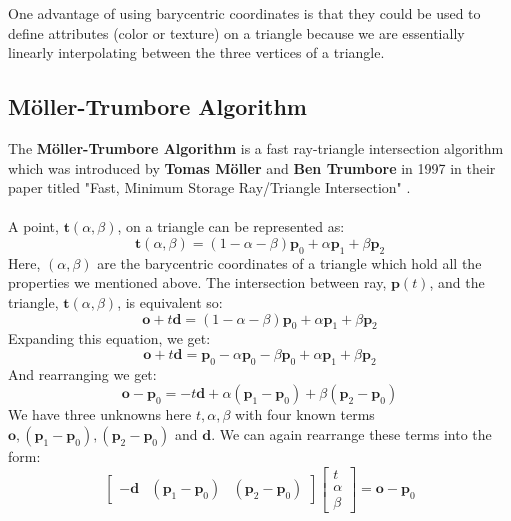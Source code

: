 \documentclass[11pt,a4paper]{article}
\begin{document}
	\noindent
	One advantage of using barycentric coordinates is that they could be used to define attributes (color or texture) on a triangle because we are essentially linearly interpolating between the three vertices of a triangle.
	
	\subsection{Möller-Trumbore Algorithm}
	The \textbf{Möller-Trumbore Algorithm} is a fast ray-triangle intersection algorithm which was introduced by \textbf{Tomas Möller} and \textbf{Ben Trumbore} in 1997 in their paper titled "Fast, Minimum Storage Ray/Triangle Intersection" \cite{moller1997fast}.\\~\\
	\noindent
	A point, $\boldsymbol{t}(\alpha, \beta)$, on a triangle can be represented as:
	\begin{equation}
	\boldsymbol{t}(\alpha, \beta) = (1 - \alpha - \beta)\boldsymbol{p}_{0} + \alpha\boldsymbol{p}_{1} + \beta\boldsymbol{p}_{2}
	\end{equation}
	\noindent
	Here, $(\alpha, \beta)$ are the barycentric coordinates of a triangle which hold all the properties we mentioned above. The intersection between ray, $\boldsymbol{p}(t)$, and the triangle, $\boldsymbol{t}(\alpha, \beta)$, is equivalent so:
	\begin{equation}
		\boldsymbol{o} + t\boldsymbol{d} = (1 - \alpha - \beta)\boldsymbol{p}_{0} + \alpha\boldsymbol{p}_{1} + \beta\boldsymbol{p}_{2}
	\end{equation}
	Expanding this equation, we get:
	\begin{equation}
		\boldsymbol{o} + t\boldsymbol{d} = \boldsymbol{p}_{0} - \alpha\boldsymbol{p}_{0} - \beta\boldsymbol{p}_{0} + \alpha\boldsymbol{p}_{1} + \beta\boldsymbol{p}_{2}
	\end{equation}
	And rearranging we get:
	\begin{equation}
		\boldsymbol{o} - \boldsymbol{p}_{0} = -t\boldsymbol{d} + \alpha(\boldsymbol{p}_{1} - \boldsymbol{p}_{0}) + \beta(\boldsymbol{p}_{2} - \boldsymbol{p}_{0})
	\end{equation}
	\noindent
	We have three unknowns here $t, \alpha, \beta$ with four known terms $\boldsymbol{o}, (\boldsymbol{p}_{1} - \boldsymbol{p}_{0}), (\boldsymbol{p}_{2} - \boldsymbol{p}_{0})$ and $\boldsymbol{d}$. We can again rearrange these terms into the form:
		\[
		\left[
		\begin{array}{ccc}
		-\boldsymbol{d} & (\boldsymbol{p}_{1} - \boldsymbol{p}_{0}) & (\boldsymbol{p}_{2} - \boldsymbol{p}_{0}) 
		\end{array}
		\right]
		\begin{bmatrix}
		t \\
		\alpha \\
		\beta 
		\end{bmatrix} = \boldsymbol{o} - \boldsymbol{p}_{0}
		\]
\end{document}

